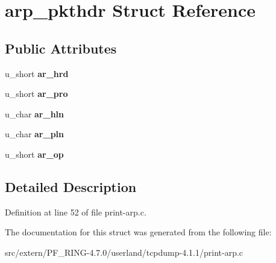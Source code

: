 \hypertarget{structarp__pkthdr}{
\section{arp\_\-pkthdr Struct Reference}
\label{structarp__pkthdr}
}
\subsection*{Public Attributes}
\begin{DoxyCompactItemize}
\item 
\hypertarget{structarp__pkthdr_a857975ccb92c84c3ca2b0e53e5896df8}{
u\_\-short {\bfseries ar\_\-hrd}}
\label{structarp__pkthdr_a857975ccb92c84c3ca2b0e53e5896df8}

\item 
\hypertarget{structarp__pkthdr_a23387b7a35c56eca16f7db906f19199d}{
u\_\-short {\bfseries ar\_\-pro}}
\label{structarp__pkthdr_a23387b7a35c56eca16f7db906f19199d}

\item 
\hypertarget{structarp__pkthdr_a5e905521b3c99324b657ba93c79bad4b}{
u\_\-char {\bfseries ar\_\-hln}}
\label{structarp__pkthdr_a5e905521b3c99324b657ba93c79bad4b}

\item 
\hypertarget{structarp__pkthdr_a68a60951bbbe4e7ea4d43fea5e892688}{
u\_\-char {\bfseries ar\_\-pln}}
\label{structarp__pkthdr_a68a60951bbbe4e7ea4d43fea5e892688}

\item 
\hypertarget{structarp__pkthdr_a392cecd00a23f53b7596836e057f9066}{
u\_\-short {\bfseries ar\_\-op}}
\label{structarp__pkthdr_a392cecd00a23f53b7596836e057f9066}

\end{DoxyCompactItemize}


\subsection{Detailed Description}


Definition at line 52 of file print-\/arp.c.



The documentation for this struct was generated from the following file:\begin{DoxyCompactItemize}
\item 
src/extern/PF\_\-RING-\/4.7.0/userland/tcpdump-\/4.1.1/print-\/arp.c\end{DoxyCompactItemize}
